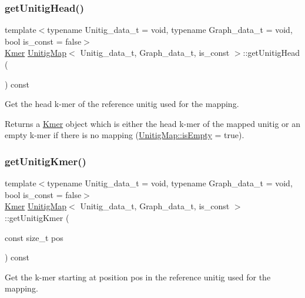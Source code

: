 \subsubsection{\texorpdfstring{get\+Unitig\+Head()}{getUnitigHead()}}
{\footnotesize\ttfamily template$<$typename Unitig\+\_\+data\+\_\+t = void, typename Graph\+\_\+data\+\_\+t = void, bool is\+\_\+const = false$>$ \\
\hyperlink{classKmer}{Kmer} \hyperlink{classUnitigMap}{Unitig\+Map}$<$ Unitig\+\_\+data\+\_\+t, Graph\+\_\+data\+\_\+t, is\+\_\+const $>$\+::get\+Unitig\+Head (\begin{DoxyParamCaption}{ }\end{DoxyParamCaption}) const}



Get the head k-\/mer of the reference unitig used for the mapping. 

\begin{DoxyReturn}{Returns}
a \hyperlink{classKmer}{Kmer} object which is either the head k-\/mer of the mapped unitig or an empty k-\/mer if there is no mapping (\hyperlink{structUnitigMapBase_ade629940b2611494dbf233cb1144da80}{Unitig\+Map\+::is\+Empty} = true). 
\end{DoxyReturn}
\mbox{\label{classUnitigMap_a7c8a9b1e16fa29d716550fc93de9d4d7}} 
\subsubsection{\texorpdfstring{get\+Unitig\+Kmer()}{getUnitigKmer()}}
{\footnotesize\ttfamily template$<$typename Unitig\+\_\+data\+\_\+t = void, typename Graph\+\_\+data\+\_\+t = void, bool is\+\_\+const = false$>$ \\
\hyperlink{classKmer}{Kmer} \hyperlink{classUnitigMap}{Unitig\+Map}$<$ Unitig\+\_\+data\+\_\+t, Graph\+\_\+data\+\_\+t, is\+\_\+const $>$\+::get\+Unitig\+Kmer (\begin{DoxyParamCaption}\item[{const size\+\_\+t}]{pos }\end{DoxyParamCaption}) const}



Get the k-\/mer starting at position pos in the reference unitig used for the mapping. 



